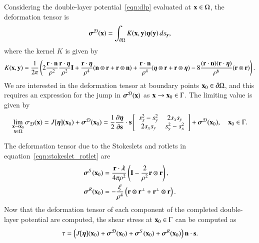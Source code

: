 \documentclass[preprint, 10pt]{elsarticle}
\begin{document}
Considering the double-layer potential~\eqref{eqn:dlp} evaluated at ${\mathbf{x}}
\in \Omega$, the deformation tensor is
\begin{align*}
  {\boldsymbol\sigma}^{\mathcal{D}}({\mathbf{x}}) = \int_{{\partial}\Omega} K({\mathbf{x}},{\mathbf{y}}) {\boldsymbol\eta}({\mathbf{y}}) \,ds_{\mathbf{y}},
\end{align*}
where the kernel $K$ is given by
\begin{align*}
  K({\mathbf{x}},{\mathbf{y}}) = \frac{1}{2\pi}\left(
    2\frac{{\mathbf{r}} \cdot {\mathbf{n}}}{\rho^2} \frac{{\mathbf{r}} \cdot {\boldsymbol\eta}}{\rho^2} {\mathbf{I}} + 
    \frac{{\mathbf{r}} \cdot {\boldsymbol\eta}}{\rho^4} ({\mathbf{n}} \otimes {\mathbf{r}} + {\mathbf{r}} \otimes {\mathbf{n}}) +
    \frac{{\mathbf{r}} \cdot {\mathbf{n}}}{\rho^4} ({\boldsymbol\eta} \otimes {\mathbf{r}} + {\mathbf{r}} \otimes {\boldsymbol\eta}) - 
    8\frac{({\mathbf{r}} \cdot {\mathbf{n}})({\mathbf{r}} \cdot {\boldsymbol\eta})}{\rho^6}({\mathbf{r}} \otimes {\mathbf{r}})
  \right).
\end{align*}
We are interested in the deformation tensor at boundary points ${\mathbf{x}}_0
\in {\partial}\Omega$, and this requires an expression for the jump in
${\boldsymbol\sigma}^{\mathcal{D}}({\mathbf{x}})$ as ${\mathbf{x}} \rightarrow {\mathbf{x}}_0 \in \Gamma$.  The limiting
value is given by~\cite{qua-bir2014a}
\begin{align}
  \lim_{\substack{{\mathbf{x}} \rightarrow {\mathbf{x}}_0 \\ {\mathbf{x}} \in \Omega}}\sigma_{\mathcal{D}}({\mathbf{x}}) =
  J[{\boldsymbol\eta}]({\mathbf{x}}_0) + {\boldsymbol\sigma}^{\mathcal{D}}({\mathbf{x}}_0) = 
  \frac{1}{2}\frac{\partial {\boldsymbol\eta}}{\partial {\mathbf{s}}} \cdot {\mathbf{s}}
  \left[ \begin{array}{cc}
    s_x^2 - s_y^2 & 2s_x s_y \\ 2s_x s_y & s_y^2 - s_x^2
  \end{array}\right] + {\boldsymbol\sigma}^{\mathcal{D}}({\mathbf{x}}_0), \quad {\mathbf{x}}_0 \in \Gamma.
\end{align}

The deformation tensor due to the Stokeslets and rotlets in
equation~\eqref{eqn:stokeslet_rotlet} are
\begin{align}
  {\boldsymbol\sigma}^S({\mathbf{x}}_0) &= \frac{{\mathbf{r}} \cdot {\boldsymbol\lambda}}{4\pi\rho^2} \left(
    {\mathbf{I}} - \frac{2}{\rho^2} {\mathbf{r}} \otimes {\mathbf{r}} \right),  \\
  {\boldsymbol\sigma}^R({\mathbf{x}}_0) &= -\frac{\xi}{\rho^4} \left({\mathbf{r}} \otimes {\mathbf{r}}^\perp + 
                           {\mathbf{r}}^\perp \otimes {\mathbf{r}} \right).
\end{align}
Now that the deformation tensor of each component of the completed
double-layer potential are computed, the shear stress at ${\mathbf{x}}_0 \in
\Gamma$ can be computed as
\begin{align}
  \tau = \left(J[{\boldsymbol\eta}]({\mathbf{x}}_0) + {\boldsymbol\sigma}^{\mathcal{D}}({\mathbf{x}}_0) + 
    {\boldsymbol\sigma}^S({\mathbf{x}}_0) + {\boldsymbol\sigma}^R({\mathbf{x}}_0)\right) {\mathbf{n}} \cdot {\mathbf{s}}.
\end{align}
\end{document}
